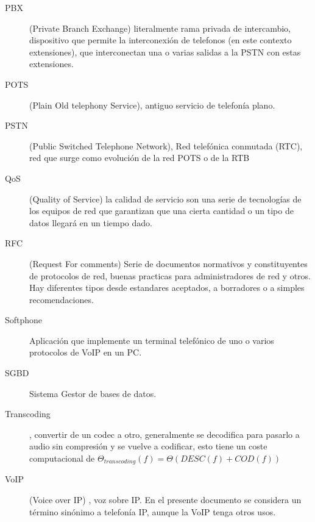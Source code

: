 \begin{description}
\item[PBX] \label{def:PBX} (Private Branch Exchange) literalmente rama privada de intercambio, dispositivo que permite la interconexión de telefonos (en este contexto extensiones), que interconectan una o varias salidas a la PSTN con estas extensiones.
\item[POTS]  \label{def:POTS} (Plain Old telephony Service), antiguo servicio de telefonía plano. 
\item[PSTN]  \label{def:PSTN} (Public Switched Telephone Network), Red telefónica conmutada (RTC), red que surge como evolución de la red POTS o de la RTB

\item[QoS] (Quality of Service) la calidad de servicio son una serie de tecnologías de los equipos de red que garantizan que una cierta cantidad o un tipo de datos llegará en un tiempo dado.


\item[RFC] (Request For comments) Serie de documentos normativos y constituyentes de protocolos de red, buenas practicas para administradores de red y otros. Hay diferentes tipos desde estandares aceptados, a borradores o a simples recomendaciones.

\item[Softphone]  \label{def:softphone} Aplicación que implemente un terminal telefónico de uno o varios protocolos de VoIP en un PC.


\item[SGBD] Sistema Gestor de bases de datos.

\item[Transcoding] \label{def:Transcoding} , convertir de un codec a otro, generalmente se decodifica para pasarlo a audio sin compresión  y se vuelve a codificar, esto tiene un coste computacional de $\Theta_{transcoding}(f) = \Theta(DESC(f) + COD(f)) $


\item[VoIP] (Voice over IP) , voz sobre IP. En el presente documento se considera un término sinónimo a telefonía IP, aunque la VoIP tenga otros usos.





 
\end{description}




